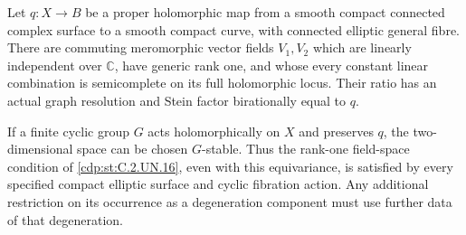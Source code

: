 \begin{proposition}\label{cdp:st:C.2.UN.26}

Let $q:X\to B$ be a proper holomorphic map from a
smooth compact connected complex surface to a smooth
compact curve, with connected elliptic general fibre.
There are commuting meromorphic vector fields $V_1,V_2$
which are linearly independent over $\mathbb C$, have
generic rank one, and whose every constant linear
combination is semicomplete on its full holomorphic
locus. Their ratio has an actual graph resolution and
Stein factor birationally equal to $q$.

If a finite cyclic group $G$ acts holomorphically on
$X$ and preserves $q$, the two-dimensional space can
be chosen $G$-stable. Thus the rank-one field-space
condition of \ref{cdp:st:C.2.UN.16}, even with this equivariance,
is satisfied by every specified compact elliptic
surface and cyclic fibration action. Any additional
restriction on its occurrence as a degeneration
component must use further data of that degeneration.
\end{proposition}

